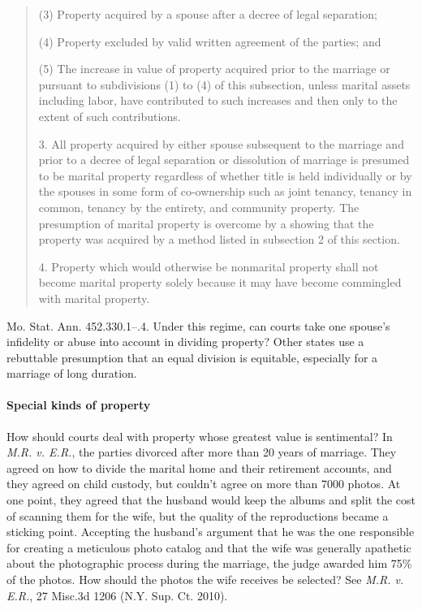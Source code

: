 \begin{quotation}
\begin{statute}
\item (3) Property acquired by a spouse after a decree of legal separation;

\item (4) Property excluded by valid written agreement of the parties; and

\item (5) The increase in value of property acquired prior to the marriage or
pursuant to subdivisions (1) to (4) of this subsection, unless marital assets
including labor, have contributed to such increases and then only to the extent
of such contributions.
\end{statute}

3. All property acquired by either spouse subsequent to the marriage and prior
to a decree of legal separation or dissolution of marriage is presumed to be
marital property regardless of whether title is held individually or by the
spouses in some form of co-ownership such as joint tenancy, tenancy in common,
tenancy by the entirety, and community property. The presumption of marital
property is overcome by a showing that the property was acquired by a method
listed in subsection 2 of this section.

4. Property which would otherwise be nonmarital property shall not become
marital property solely because it may have become commingled with marital
property.
\end{quotation}
Mo. Stat. Ann. 452.330.1--.4.
Under this regime, can courts take one spouse's infidelity or abuse into account
in dividing property? Other states use a rebuttable presumption that an equal
division is equitable, especially for a marriage of long duration.

\paragraph{Special kinds of property} How should courts deal with property whose
greatest value is sentimental? In \textit{M.R. v. E.R.}, the parties divorced
after more than 20 years of marriage. They agreed on how to divide the marital
home and their retirement accounts, and they agreed on child custody, but
couldn't agree on more than 7000 photos. At one point, they agreed that the
husband would keep the albums and split the cost of scanning them for the wife,
but the quality of the reproductions became a sticking point. Accepting the
husband's argument that he was the one responsible for creating a meticulous
photo catalog and that the wife was generally apathetic about the photographic
process during the marriage, the judge awarded him 75\% of the photos. How
should the photos the wife receives be selected? See \emph{M.R. v. E.R.}, 27
Misc.3d 1206 (N.Y. Sup. Ct. 2010).


